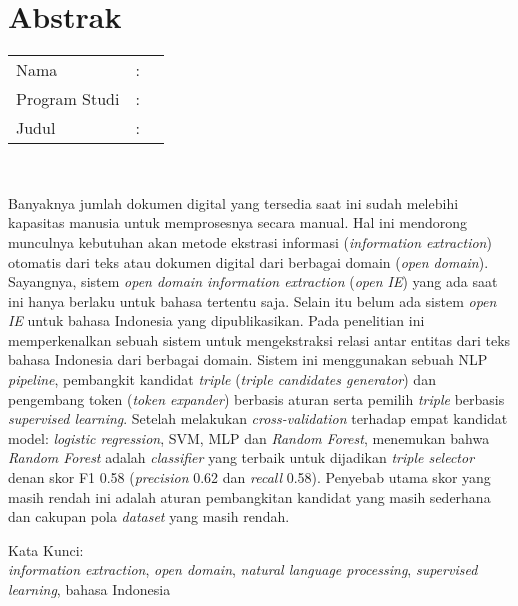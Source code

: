 %
%
%

\chapter*{Abstrak}

\vspace*{0.2cm}

\noindent \begin{tabular}{l l p{10cm}}
	Nama&: & \penulis \\
	Program Studi&: & \program \\
	Judul&: & \judul \\
\end{tabular} \\ 

\vspace*{0.5cm}

\noindent Banyaknya jumlah dokumen digital yang tersedia saat ini sudah melebihi kapasitas manusia untuk memprosesnya secara manual. Hal ini mendorong munculnya kebutuhan akan metode ekstrasi informasi (\textit{information extraction}) otomatis dari teks atau dokumen digital dari berbagai domain (\textit{open domain}). Sayangnya, sistem \textit{open domain information extraction} (\textit{open IE}) yang ada saat ini hanya berlaku untuk bahasa tertentu saja. Selain itu belum ada sistem \textit{open IE} untuk bahasa Indonesia yang dipublikasikan. Pada penelitian ini \saya memperkenalkan sebuah sistem untuk mengekstraksi relasi antar entitas dari teks bahasa Indonesia dari berbagai domain. Sistem ini menggunakan sebuah NLP \textit{pipeline}, pembangkit kandidat \textit{triple} (\textit{triple candidates generator}) dan pengembang token (\textit{token expander}) berbasis aturan serta pemilih \textit{triple} berbasis \textit{supervised learning}. Setelah melakukan \textit{cross-validation} terhadap empat kandidat model: \textit{logistic regression}, SVM, MLP dan \textit{Random Forest}, \saya menemukan bahwa \textit{Random Forest} adalah \textit{classifier} yang terbaik untuk dijadikan \textit{triple selector} denan skor F1 0.58 (\textit{precision} 0.62 dan \textit{recall} 0.58). Penyebab utama skor yang masih rendah ini adalah aturan pembangkitan kandidat yang masih sederhana dan cakupan pola \textit{dataset} yang masih rendah. \\

\vspace*{0.2cm}

\noindent Kata Kunci: \\ 
\noindent \textit{information extraction}, \textit{open domain}, \textit{natural language processing}, \textit{supervised learning}, bahasa Indonesia \\

\newpage
